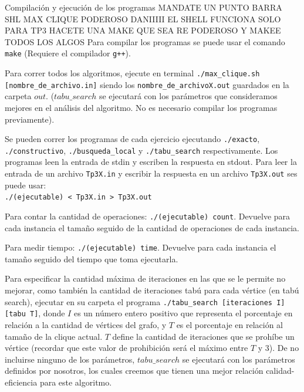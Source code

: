 \documentclass[12pt,titlepage]{article}
\begin{document}
	\begin{section}{Compilación y ejecución de los programas}
	MANDATE UN PUNTO BARRA SHL MAX CLIQUE PODEROSO DANIIIII EL SHELL FUNCIONA SOLO PARA TP3
	HACETE UNA MAKE QUE SEA RE PODEROSO Y MAKEE TODOS LOS ALGOS
	Para compilar los programas se puede usar el comando \texttt{make} (Requiere el compilador \texttt{g++}).
	
	Para correr todos los algoritmos, ejecute en terminal \texttt{./max\_clique.sh [nombre\_de\_archivo.in]} siendo los \texttt{nombre\_de\_archivoX.out} guardados en la carpeta $out$. ($tabu\_search$ se ejecutará con los parámetros que consideramos mejores en el análisis del algoritmo. No es necesario compilar los programas previamente).
		
	Se pueden correr los programas de cada ejercicio ejecutando \texttt{./exacto}, \texttt{./constructivo}, \texttt{./busqueda\_local} y \texttt{./tabu\_search} respectivamente. Los programas leen la entrada de stdin y escriben la respuesta en stdout. Para leer la entrada de un archivo \texttt{Tp3X.in} y escribir la respuesta en un archivo \texttt{Tp3X.out} ses puede usar:\\ \texttt{./(ejecutable) < Tp3X.in > Tp3X.out}

	Para contar la cantidad de operaciones: \texttt{./(ejecutable) count}. Devuelve para cada instancia el tamaño seguido de la cantidad de operaciones de cada instancia.

	Para medir tiempo: \texttt{./(ejecutable) time}. Devuelve para cada instancia el tamaño seguido del tiempo que toma ejecutarla.

	Para especificar la cantidad máxima de iteraciones en las que se le permite no mejorar, como también la cantidad de iteraciones tabú para cada vértice (en tabú search), ejecutar en su carpeta el programa \texttt{./tabu\_search [iteraciones \texttt{I}] [tabu \texttt{T}]}, donde $I$ es un número entero positivo que representa el porcentaje en relación a la cantidad de vértices del grafo, y $T$ es el porcentaje en relación al tamaño de la clique actual. $T$ define la cantidad de iteraciones que se prohíbe un vértice (recordar que este valor de prohibición será el máximo entre $T$ y 3).
	De no incluirse ninguno de los parámetros, $tabu\_search$ se ejecutará con los parámetros definidos por nosotros, los cuales creemos que tienen una mejor relación calidad-eficiencia para este algoritmo.

	\end{section}
\end{document}

